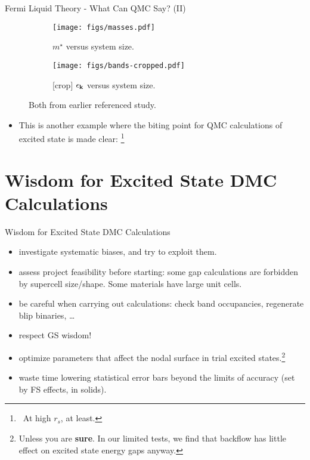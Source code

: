 \documentclass[12pt, pdf, hyperref={draft}, usenames, dvipsnames,
aspectratio=169]{beamer}
\newcommand{\red}[1]{{\bf\color{LancsRed}{#1}}}
\newcommand{\green}[1]{{\bf\color{ForestGreen}{#1}}}
\begin{document}
\begin{frame}{Fermi Liquid Theory - What Can QMC Say? (II)}
\begin{figure}[H]
    \centering
    \begin{subfigure}[c]{0.48\textwidth}
        \texttt{[image: figs/masses.pdf]}
        \caption{$m^{\star}$ versus system size.}\label{fig:masses}
    \end{subfigure}
    \begin{subfigure}[c]{0.48\textwidth}
        \texttt{[image: figs/bands-cropped.pdf]}
        \caption{[crop] $\epsilon_{\bf k}$ versus system size.}\label{fig:bands}
    \end{subfigure}
    \caption{Both from earlier referenced study.}\label{fig:masses_bands}
\end{figure}
\vspace*{-0.5cm}
\begin{itemize}
  \item This is another example where the biting point for QMC calculations of
  excited state is made clear: \red{Finite Size Effects!}\footnote{\ At high
  $r_s$, at least.}
\end{itemize}
\end{frame}


\section{Wisdom for Excited State DMC Calculations}\label{sec:wisdom}
\begin{frame}{Wisdom for Excited State DMC Calculations}

\begin{itemize}
  \item \green{Do} investigate systematic biases, and try to exploit them.

  \item \green{Do} assess project feasibility before starting: some gap
  calculations are forbidden by supercell size/shape. Some materials have large
  unit cells.

  \item \green{Do} be careful when carrying out calculations: check band
  occupancies, regenerate blip binaries, \ldots

  \item \green{Do} respect GS wisdom!

  \item \red{Don't} optimize parameters that affect the nodal surface in trial
  excited states.\footnote{Unless you are \textbf{sure}. In our limited tests,
  we find that backflow has little effect on excited state energy gaps anyway.}

  \item \red{Don't} waste time lowering statistical error bars beyond the
  limits of accuracy (set by FS effects, in solids).

\end{itemize}

\end{frame}
\end{document}
